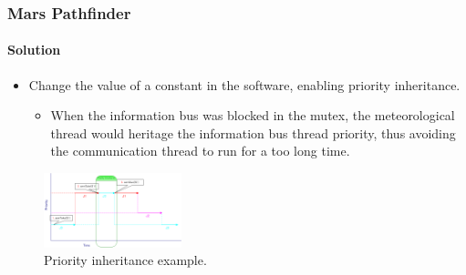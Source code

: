 \begin{frame}[hasprev=true, hasnext=false]
\frametitle{Mars Pathfinder}
\framesubtitle{Solution}

\begin{itemize}
	\item Change the value of a constant in the software, enabling priority
	inheritance.
	\begin{itemize}
		\item When the information bus was blocked in the mutex, the
		meteorological thread would heritage the information bus thread
		priority, thus avoiding the communication thread to run for a too
		long time.
	\end{itemize}
\end{itemize}

\begin{figure}
	\centering
	\includegraphics[width=4cm]{aux/examples/mars-pathfinder/priority-inheritance}
	\caption{Priority inheritance example.}
\end{figure}

\end{frame}